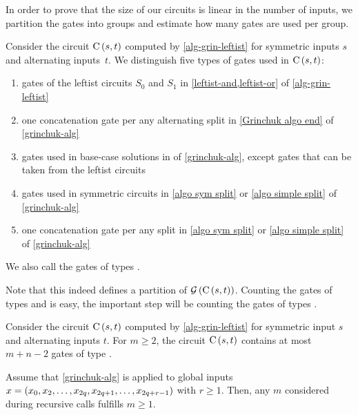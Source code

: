 In order to prove that the size of our \aop{} circuits is linear in the number of inputs,
we partition the gates into groups
and estimate how many gates are used per group.

\begin{definition} \label{grin-gate-partition}
 Consider the circuit $\operatorname{C}\left({s, t}\right)$ computed by \cref{alg-grin-leftist} for
 symmetric inputs $s$ and alternating inputs~$t$.
 We distinguish five types of gates used in $\operatorname{C}\left({s, t}\right)$:
 \begin{enumerate}
  \item gates of the leftist circuits $S\!_0$ and $S\!_1$ in \cref{leftist-and,leftist-or} 
      of \cref{alg-grin-leftist} \label{leftist-gates}
  \item one concatenation gate per any alternating split in \cref{Grinchuk algo end} 
      of \cref{grinchuk-alg} \label{alt-split-gates}
  \item gates used in base-case solutions in  
      of \cref{grinchuk-alg}\label{base-case-gates}, except gates that can be taken from the 
      leftist circuits
  \item gates used in symmetric circuits in \cref{algo sym split} or \cref{algo simple split} 
      of \cref{grinchuk-alg} \label{symtree-gates}
  \item one concatenation gate per any split in \cref{algo sym split} or \cref{algo simple split}
      of \cref{grinchuk-alg} \label{split-gates}
 \end{enumerate}
 We also call the gates of types  .
\end{definition}

Note that this indeed defines a partition of $\operatorname{\mathcal G}\left({\operatorname{C}\left({s, t}\right)}\right)$.
Counting the gates of types  and 
is easy,
the important step will be counting the gates of types .

\begin{observation} \label{lem-leftist-gates}
 Consider the circuit $\operatorname{C}\left({s, t}\right)$ computed by \cref{alg-grin-leftist} for
 symmetric input $s$ and alternating inputs $t$.
 For $m \geq 2$, the circuit $\operatorname{C}\left({s, t}\right)$ contains at most $m + n - 2$ gates of type .
\end{observation}

\begin{observation} \label{m > 0}
 Assume that \cref{grinchuk-alg} is applied to global inputs 
 $x = ({x_0, x_2, \dotsc, x_{2q}, x_{2q+1}, \dotsc, x_{2q + r - 1}})$ with $r \geq 1$.
 Then, any $m$ considered during recursive calls fulfills $m \geq 1$.
\end{observation}

